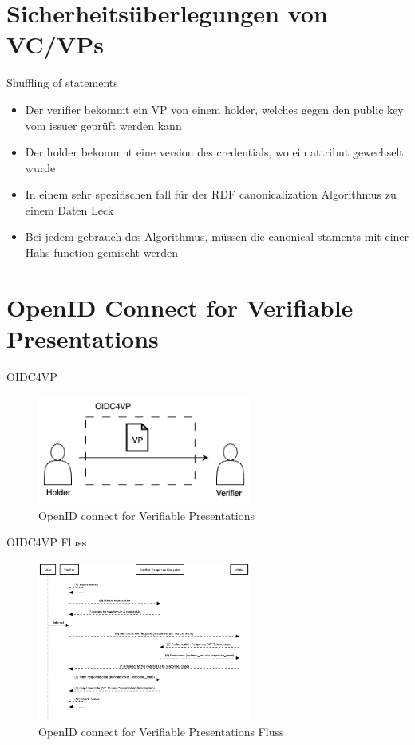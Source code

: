 \documentclass[
	german,%
	authorontitle=true,
	]{bfhbeamer}
\begin{document}
\section{Sicherheitsüberlegungen von VC/VPs}

\begin{frame}{Shuffling of statements}
    \begin{itemize}
        \item Der verifier bekommt ein VP von einem holder, welches gegen den public key vom issuer geprüft werden kann
        \item Der holder bekommnt eine version des credentials, wo ein attribut gewechselt wurde
        \item In einem sehr spezifischen fall für der RDF canonicalization Algorithmus zu einem Daten Leck
        \item Bei jedem gebrauch des Algorithmus, müssen die canonical staments mit einer Hahs function gemischt werden
    \end{itemize}
\end{frame}

\section{OpenID Connect for Verifiable Presentations}

\begin{frame}{OIDC4VP}
    \begin{figure}
        \centering
        \includegraphics[width=70mm]{../img/OIDC4VP.png}
        \caption{OpenID connect for Verifiable Presentations}
    \end{figure}
\end{frame}

\begin{frame}{OIDC4VP Fluss}
    \begin{figure}
        \centering
        \includegraphics[width=70mm]{../img/OIDC4VPFlow.png}
        \caption{OpenID connect for Verifiable Presentations Fluss}
    \end{figure}
\end{frame}
\end{document}
